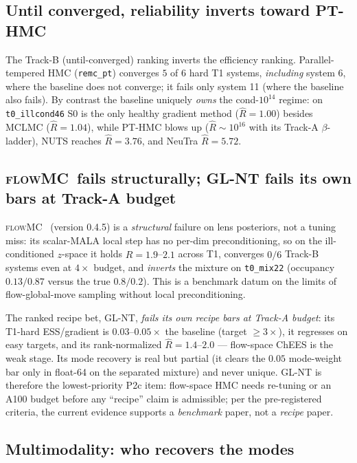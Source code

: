 \documentclass[11pt,letterpaper]{article}
\newcommand{\Rhat}{\ensuremath{\hat{R}}}
\newcommand{\flowmc}{\textsc{flowMC}}
\newcommand{\dfile}[1]{\texttt{#1}}
\begin{document}
\subsection{Until converged, reliability inverts toward PT-HMC}

The Track-B (until-converged) ranking inverts the efficiency ranking.
Parallel-tempered HMC (\texttt{remc\_pt}) converges $5$ of $6$ hard T1 systems,
{\it including} system 6, where the baseline does not converge; it fails only
system 11 (where the baseline also fails). By contrast the baseline uniquely
{\it owns} the cond-$10^{14}$ regime: on \dfile{t0\_illcond46} S0 is the only
healthy gradient method ($\Rhat=1.00$) besides MCLMC ($\Rhat=1.04$), while
PT-HMC blows up ($\Rhat\sim10^{16}$ with its Track-A $\beta$-ladder), NUTS
reaches $\Rhat=3.76$, and NeuTra $\Rhat=5.72$.

\subsection{\flowmc\ fails structurally; GL-NT fails its own bars at Track-A
budget}

\flowmc\ \citep{wong2023flowmc} (version 0.4.5) is a {\it structural} failure on
lens posteriors, not a tuning miss: its scalar-MALA local step has no per-dim
preconditioning, so on the ill-conditioned $z$-space it holds $\Rhat=1.9$--$2.1$
across T1, converges $0/6$ Track-B systems even at $4\times$ budget, and {\it
inverts} the mixture on \dfile{t0\_mix22} (occupancy $0.13/0.87$ versus the true
$0.8/0.2$). This is a benchmark datum on the limits of flow-global-move sampling
without local preconditioning.

The ranked recipe bet, GL-NT, {\it fails its own recipe bars at Track-A budget}:
its T1-hard ESS/gradient is $0.03$--$0.05\times$ the baseline (target $\ge3\times$),
it regresses on easy targets, and its rank-normalized $\Rhat=1.4$--$2.0$ ---
flow-space ChEES is the weak stage. Its mode recovery is real but partial (it
clears the $0.05$ mode-weight bar only in float-64 on the separated mixture) and
never unique. GL-NT is therefore the lowest-priority P2c item: flow-space HMC
needs re-tuning or an A100 budget before any ``recipe'' claim is admissible; per
the pre-registered criteria, the current evidence supports a {\it benchmark}
paper, not a {\it recipe} paper.

\subsection{Multimodality: who recovers the modes}
\end{document}
